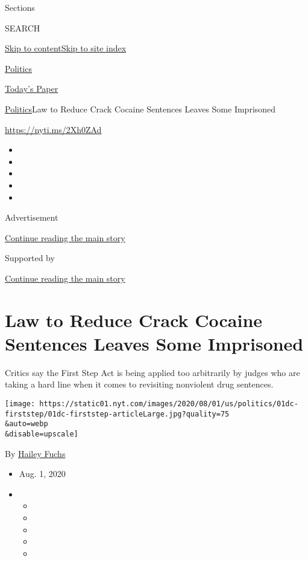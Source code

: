 Sections

SEARCH

\protect\hyperlink{site-content}{Skip to
content}\protect\hyperlink{site-index}{Skip to site index}

\href{https://www.nytimes.com/section/politics}{Politics}

\href{https://myaccount.nytimes.com/auth/login?response_type=cookie\&client_id=vi}{}

\href{https://www.nytimes.com/section/todayspaper}{Today's Paper}

\href{/section/politics}{Politics}\textbar{}Law to Reduce Crack Cocaine
Sentences Leaves Some Imprisoned

\url{https://nyti.ms/2Xh0ZAd}

\begin{itemize}
\item
\item
\item
\item
\item
\end{itemize}

Advertisement

\protect\hyperlink{after-top}{Continue reading the main story}

Supported by

\protect\hyperlink{after-sponsor}{Continue reading the main story}

\hypertarget{law-to-reduce-crack-cocaine-sentences-leaves-some-imprisoned}{%
\section{Law to Reduce Crack Cocaine Sentences Leaves Some
Imprisoned}\label{law-to-reduce-crack-cocaine-sentences-leaves-some-imprisoned}}

Critics say the First Step Act is being applied too arbitrarily by
judges who are taking a hard line when it comes to revisiting nonviolent
drug sentences.

\texttt{[image: https://static01.nyt.com/images/2020/08/01/us/politics/01dc-firststep/01dc-firststep-articleLarge.jpg?quality=75\\\&auto=webp\\\&disable=upscale]}

By \href{https://www.nytimes.com/by/hailey-fuchs}{Hailey Fuchs}

\begin{itemize}
\item
  Aug. 1, 2020
\item
  \begin{itemize}
  \item
  \item
  \item
  \item
  \item
  \end{itemize}
\end{itemize}

